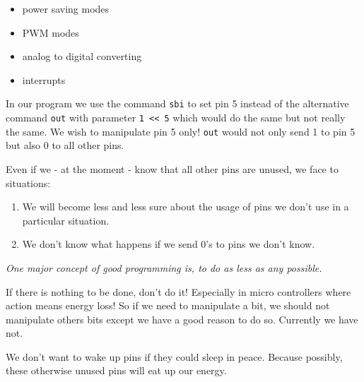 \begin{itemize}
  \item power saving modes
  \item PWM modes
  \item analog to digital converting
  \item interrupts
\end{itemize}

In our program we use the command \texttt{sbi} to set pin 5 instead of the alternative command \texttt{out} with parameter \texttt{1 << 5} which would do the same but not really the same. We wish to manipulate pin 5 only! \texttt{out} would not only send 1 to pin 5 but also 0 to all other pins.

Even if we - at the moment - know that all other pins are unused, we face to situations:

\begin{enumerate}
  \item We will become less and less sure about the usage of pins we don't use in a particular situation.
  \item We don't know what happens if we send 0's to pins we don't know.
\end{enumerate}

\emph{One major concept of good programming is, to do as less as any possible.}

If there is nothing to be done, don't do it! Especially in micro controllers where action means energy loss! So if we need to manipulate a bit, we should not manipulate others bits except we have a good reason to do so. Currently we have not.

We don't want to wake up pins if they could sleep in peace. Because possibly, these otherwise unused pins will eat up our energy.


